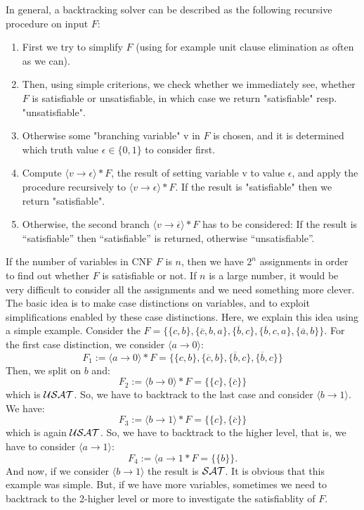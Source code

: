 \documentclass[12pt]{book}
\begin{document}
\begin{examp}
\begin{defi}
In general, a backtracking solver can be described as the following recursive procedure on input $F$:
\begin{enumerate}
\item First we try to simplify $F$ (using for example unit clause elimination as often as we can).
\item Then, using simple criterions, we check whether we immediately see, whether $F$ is satisfiable or
unsatisfiable, in which case we return "satisfiable" resp. "unsatisfiable".
\item Otherwise some "branching variable" v in $F$ is chosen, and it is determined which truth value $\epsilon \in \{ 0, 1\}$ to consider first.
\item Compute $\langle v \to \epsilon \rangle * F$, the result of setting variable v to value $\epsilon$, and apply the procedure recursively to
$\langle v \to \epsilon \rangle * F$. If the result is "satisfiable" then we return "satisfiable".
\item Otherwise, the second branch $\langle v \to \overline{\epsilon} \rangle * F$ has to be considered: If the result is “satisfiable” then
“satisfiable” is returned, otherwise “unsatisfiable”.
\end{enumerate}
\end{defi}

\begin{examp}\label{exp:bdd}
If the number of variables in CNF $F$ is $n$, then we have $2^n$ assignments in order to find out whether $F$ is satisfiable or not.
If $n$ is a large number, it would be very difficult to consider all the assignments and we need something more clever.
The basic idea is to make case distinctions on variables, and to exploit simplifications enabled by these case distinctions.
Here, we explain this idea using a simple example. Consider the $F = \{ \{c,b\}, \{\overline{c},b,a\}, \{\overline{b},c\}, \{\overline{b},c,a\}, \{{\overline{a},b}\} \}$. 
For the first case distinction, we consider $\langle a \to 0 \rangle$:
$$ F_1 := \langle a \to 0 \rangle * F = \{ \{c,b\}, \{\overline{c},b\}, \{\overline{b},c\}, \{\overline{b},c\} \}$$
Then, we split on $b$ and:
$$ F_2 := \langle b \to 0 \rangle * F = \{ \{c\}, \{\overline{c}\} \}$$
which is $\mathcal{USAT}$. So, we have to backtrack to the last case and consider $\langle b \to 1 \rangle$. We have:
$$ F_3 := \langle b \to 1 \rangle * F = \{ \{c\}, \{\overline{c}\} \}$$
which is again $\mathcal{USAT}$. So, we have to backtrack to the higher level, that is, we have to consider $\langle a \to 1 \rangle$:
$$ F_4 := \langle a \to 1 * F = \{ \{b\} \}.$$
And  now, if we consider $\langle b \to 1 \rangle$ the result is $\mathcal{SAT}$. It is obvious that this example was simple. But, if we have more variables, 
sometimes we need to backtrack to the 2-higher level or more to investigate the satisfiablity of $F$.
\end{examp}

\end{examp}
\end{document}
